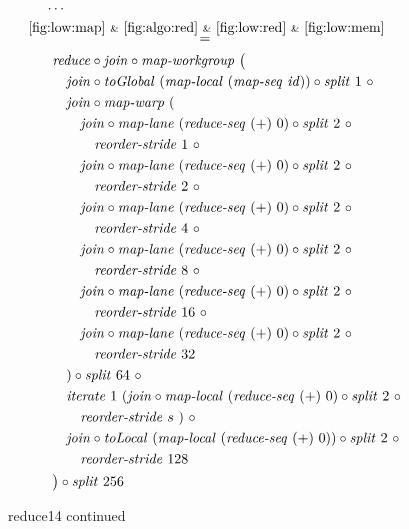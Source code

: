 \begin{figure*}[t]
\begin{align*}
  &\hspace{.5em}\ldots\\
%
  &\hspace{-2em}\quad\begin{aligned}
    &\overset{\ref{fig:low:map}\ \&\ \ref{fig:algo:red}\ \&\ \ref{fig:low:red}\ \&\ \ref{fig:low:mem}}{=\hspace{.2em}}\\
    &\qquad
      \reduce \circ \join \circ \mapWorkgroup\ \big(\\
    &\qquad\quad \join \circ \toGlobal\ (\mapLocal\ (\mapSeq\ \id)) \circ \splitN\ 1\ \circ\\
    &\qquad\quad \join \circ \mapWarp\ (\\
    &\qquad\qquad \join \circ \mapLane\ (\reduceSeq\ (+)\ 0) \circ \splitN\ 2\ \circ\\
    &\qquad\qquad\quad \reorderStride\ 1\ \circ\\
    &\qquad\qquad \join \circ \mapLane\ (\reduceSeq\ (+)\ 0) \circ \splitN\ 2\ \circ\\
    &\qquad\qquad\quad \reorderStride\ 2\ \circ\\
    &\qquad\qquad \join \circ \mapLane\ (\reduceSeq\ (+)\ 0) \circ \splitN\ 2\ \circ\\
    &\qquad\qquad\quad \reorderStride\ 4\ \circ\\
    &\qquad\qquad \join \circ \mapLane\ (\reduceSeq\ (+)\ 0) \circ \splitN\ 2\ \circ\\
    &\qquad\qquad\quad \reorderStride\ 8\ \circ\\
    &\qquad\qquad \join \circ \mapLane\ (\reduceSeq\ (+)\ 0) \circ \splitN\ 2\ \circ\\
    &\qquad\qquad\quad \reorderStride\ 16\ \circ\\
    &\qquad\qquad \join \circ \mapLane\ (\reduceSeq\ (+)\ 0) \circ \splitN\ 2\ \circ\\
    &\qquad\qquad\quad \reorderStride\ 32\\
    &\qquad\quad) \circ \splitN\ 64\ \circ\\
    &\qquad\quad \iterateN\ 1\ (\join \circ \mapLocal\ (\reduceSeq\ (+)\ 0) \circ \splitN\ 2\ \circ\\
    &\qquad\qquad \reorderStride\ s\ )\ \circ\\
    &\qquad\quad \join \circ \toLocal\ (\mapLocal\ (\reduceSeq\ (+)\ 0)) \circ \splitN\ 2\ \circ\\
    &\qquad\qquad \reorderStride\ 128\\
    &\qquad\big) \circ \splitN\ 256
  \end{aligned}
%  
\end{align*}
\caption{reduce14 continued}
\end{figure*}

